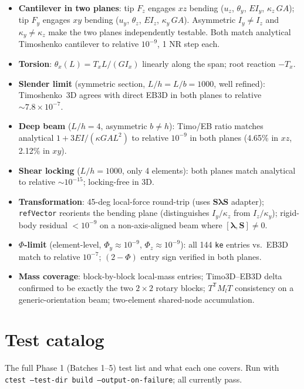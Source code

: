 \documentclass[11pt,a4paper]{book}
\newcommand{\bmath}[1]{\boldsymbol{#1}}
\newcommand{\Sdiag}{\bmath{S}}
\newcommand{\lam}{\bmath{\lambda}}
\begin{document}
\begin{itemize}[leftmargin=*]
    \item \textbf{Cantilever in two planes}: tip $F_z$ engages $xz$ bending ($u_z$, $\theta_y$, $E I_y$, $\kappa_z\,GA$); tip $F_y$ engages $xy$ bending ($u_y$, $\theta_z$, $E I_z$, $\kappa_y\,GA$). Asymmetric $I_y \ne I_z$ and $\kappa_y \ne \kappa_z$ make the two planes independently testable. Both match analytical Timoshenko cantilever to relative $10^{-9}$, 1 NR step each.
    \item \textbf{Torsion}: $\theta_x(L) = T_x L / (G I_x)$ linearly along the span; root reaction $-T_x$.
    \item \textbf{Slender limit} (symmetric section, $L/h = L/b = 1000$, well refined): Timoshenko~3D agrees with direct EB3D in both planes to relative $\sim 7.8 \times 10^{-7}$.
    \item \textbf{Deep beam} ($L/h = 4$, asymmetric $b \ne h$): Timo/EB ratio matches analytical $1 + 3 EI/(\kappa GA L^2)$ to relative $10^{-9}$ in both planes (4.65\% in $xz$, 2.12\% in $xy$).
    \item \textbf{Shear locking} ($L/h = 1000$, only 4 elements): both planes match analytical to relative $\sim 10^{-15}$; locking-free in 3D.
    \item \textbf{Transformation}: 45-deg local-force round-trip (uses $\Sdiag\lam\Sdiag$ adapter); \texttt{refVector} reorients the bending plane (distinguishes $I_y/\kappa_z$ from $I_z/\kappa_y$); rigid-body residual $< 10^{-9}$ on a non-axis-aligned beam where $[\lam, \Sdiag] \ne 0$.
    \item \textbf{$\Phi$-limit} (element-level, $\Phi_y \approx 10^{-9}$, $\Phi_z \approx 10^{-9}$): all 144 \texttt{ke} entries vs.\ EB3D match to relative $10^{-7}$; $(2-\Phi)$ entry sign verified in both planes.
    \item \textbf{Mass coverage}: block-by-block local-mass entries; Timo3D--EB3D delta confirmed to be exactly the two $2\times 2$ rotary blocks; $T^\mathsf{T} M_l T$ consistency on a generic-orientation beam; two-element shared-node accumulation.
\end{itemize}

\appendix

\chapter{Test catalog}\label{app:tests}

The full Phase 1 (Batches 1--5) test list and what each one covers. Run with \texttt{ctest --test-dir build --output-on-failure}; all currently pass.
\end{document}
